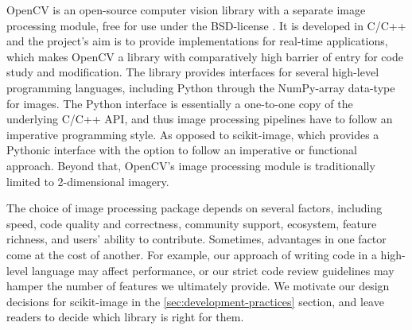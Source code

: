   OpenCV is an open-source computer vision library with a separate image
  processing module, free for use under the BSD-license \citep{opencv}. It is
  developed in C/C++ and the project's aim is to provide implementations for
  real-time applications, which makes OpenCV a library with comparatively high
  barrier of entry for code study and modification. The library provides
  interfaces for several high-level programming languages, including Python
  through the NumPy-array data-type for images. The Python interface is
  essentially a one-to-one copy of the underlying C/C++ API, and thus image
  processing pipelines have to follow an imperative programming style. As
  opposed to scikit-image, which provides a Pythonic interface with the option
  to follow an imperative or functional approach. Beyond that, OpenCV's image
  processing module is traditionally limited to 2-dimensional imagery.

  The choice of image processing package depends on several factors, including
  speed, code quality and correctness, community support, ecosystem, feature
  richness, and users' ability to contribute. Sometimes, advantages in one
  factor come at the cost of another. For example, our approach of writing code
  in a high-level language may affect performance, or our strict code review
  guidelines may hamper the number of features we ultimately provide. We
  motivate our design decisions for scikit-image in the
  \ref{sec:development-practices} section, and leave readers to decide which
  library is right for them.
